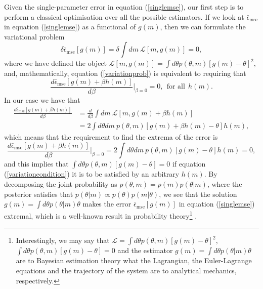 Given the single-parameter error in equation (\ref{singlemse}), our first step is to perform a classical optimisation over all the possible estimators. If we look at $\bar{\epsilon}_{\mathrm{mse}}$ in equation (\ref{singlemse}) as a functional of $g(m)$, then we can formulate the variational problem \cite{jaynes2003}
\begin{equation}
\delta \bar{\epsilon}_{\mathrm{mse}}\left[g(m)\right] = \delta \int dm~\mathcal{L}\left[m, g(m) \right] = 0,
\label{variationprob}
\end{equation}
where we have defined the object $\mathcal{L}\left[m, g(m) \right] = \int d\theta p(\theta, m)\left[g(m) - \theta\right]^2$, and, mathematically, equation (\ref{variationprob}) is equivalent to requiring that \cite{mathematics2004}
\begin{equation}
\frac{d \bar{\epsilon}_{\mathrm{mse}}\left[g(m)+\beta h(m)\right]}{d\beta} \bigg\rvert_{\beta = 0} = 0,~~\text{for~all}~~h(m). 
\end{equation}
In our case we have that
\begin{align}
\frac{d \bar{\epsilon}_{\mathrm{mse}}\left[g(m)+\beta h(m)\right]}{d\beta} &= \frac{d}{d\beta} \int dm~\mathcal{L}\left[m, g(m) + \beta h(m) \right] 
\nonumber \\
&= 2 \int d\theta dm~p(\theta, m) \left[ g(m) + \beta h(m) - \theta \right] h(m),
\label{firstvariation}
\end{align}
which means that the requirement to find the extrema of the error is
\begin{equation}
\frac{d \bar{\epsilon}_{\mathrm{mse}}\left[g(m)+\beta h(m)\right]}{d\beta} \bigg\rvert_{\beta = 0} = 2 \int d\theta dm~p(\theta, m) \left[ g(m) - \theta \right] h(m) = 0,
\label{variationcondition}
\end{equation}
and this implies that $\int d\theta p(\theta, m) [g(m) - \theta] = 0$ if equation (\ref{variationcondition}) it is to be satisfied by an arbitrary $h(m)$. By decomposing the joint probability as $p(\theta, m) = p(m) p(\theta|m)$, where the posterior satisfies that $p(\theta|m) \propto p(\theta)p(m|\theta)$, we see that the solution $g(m) = \int d\theta p(\theta|m) \theta$ makes the error $\bar{\epsilon}_{\mathrm{mse}}\left[g(m)\right]$ in equation (\ref{singlemse}) extremal, which is a well-known result in probability theory\footnote{Interestingly, we may say that $\mathcal{L} = \int d\theta p(\theta, m)\left[g(m) - \theta\right]^2$, $\int d\theta p(\theta, m) [g(m) - \theta] = 0$ and the estimator $g(m) = \int d\theta p(\theta|m) \theta$ are to Bayesian estimation theory what the Lagrangian, the Euler-Lagrange equations and the trajectory of the system are to analytical mechanics, respectively.} \cite{jaynes2003}.

